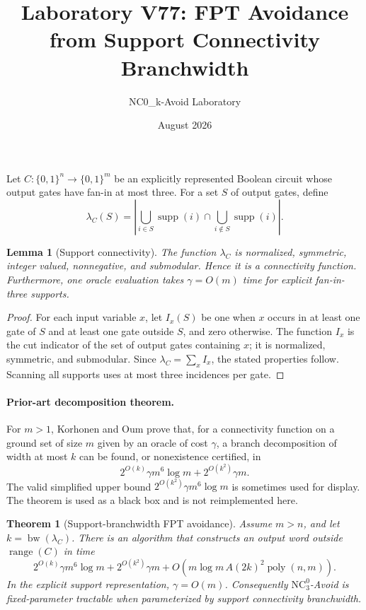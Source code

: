 \documentclass[11pt]{article}
\title{Laboratory V77: FPT Avoidance from Support Connectivity Branchwidth}
\author{NC0\_k-Avoid Laboratory}
\date{August 2026}
\newtheorem{theorem}{Theorem}
\newtheorem{lemma}{Lemma}
\begin{document}
\maketitle

Let $C:\{0,1\}^n\to\{0,1\}^m$ be an explicitly represented Boolean
circuit whose output gates have fan-in at most three. For a set $S$ of output
gates, define
\[
 \lambda_C(S)=\left|\bigcup_{i\in S}\operatorname{supp}(i)
 \cap \bigcup_{i\notin S}\operatorname{supp}(i)\right|.
\]

\begin{lemma}[Support connectivity]
The function $\lambda_C$ is normalized, symmetric, integer valued,
nonnegative, and submodular. Hence it is a connectivity function.
Furthermore, one oracle evaluation takes $\gamma=O(m)$ time for explicit
fan-in-three supports.
\end{lemma}

\begin{proof}
For each input variable $x$, let $I_x(S)$ be one when $x$ occurs in at least
one gate of $S$ and at least one gate outside $S$, and zero otherwise. The
function $I_x$ is the cut indicator of the set of output gates containing
$x$; it is normalized, symmetric, and submodular. Since
$\lambda_C=\sum_x I_x$, the stated properties follow. Scanning all supports
uses at most three incidences per gate.
\end{proof}

\paragraph{Prior-art decomposition theorem.}
For $m>1$, Korhonen and Oum prove that, for a connectivity function on a
ground set of size $m$ given by an oracle of cost $\gamma$, a branch
decomposition of width at most $k$ can be found, or nonexistence certified, in
\[
 2^{O(k)}\gamma m^6\log m+2^{O(k^2)}\gamma m.
\]
The valid simplified upper bound
$2^{O(k^2)}\gamma m^6\log m$ is sometimes used for display. The theorem is
used as a black box and is not reimplemented here.

\begin{theorem}[Support-branchwidth FPT avoidance]
Assume $m>n$, and let $k=\operatorname{bw}(\lambda_C)$. There is an algorithm
that constructs an output word outside $\operatorname{range}(C)$ in time
\[
 2^{O(k)}\gamma m^6\log m
 +2^{O(k^2)}\gamma m
 +O\!\left(m\log m\,A(2k)^2\operatorname{poly}(n,m)\right).
\]
In the explicit support representation, $\gamma=O(m)$. Consequently
$\mathrm{NC}^0_3$-Avoid is fixed-parameter tractable when parameterized by
support connectivity branchwidth.
\end{theorem}
\end{document}
